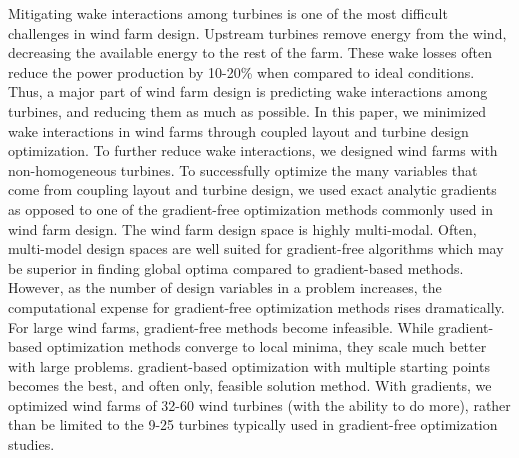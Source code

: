 
Mitigating wake interactions among turbines is one of the most difficult challenges in wind farm design. Upstream turbines remove energy from the wind, decreasing the available energy to the rest of the farm. These wake losses often reduce the power production by 10-20\% when compared to ideal conditions\cite{barthelmie2007modelling,barthelmie2009modelling,briggs2013navigating}. 
Thus, a major part of wind farm design is predicting wake interactions among turbines, and reducing them as much as possible. 
In this paper, we minimized wake interactions in wind farms through coupled layout and turbine design optimization. To further reduce wake interactions, we designed wind farms with non-homogeneous turbines.
To successfully optimize the many variables that come from coupling layout and turbine design, we used exact analytic gradients as opposed to one of the gradient-free optimization methods commonly used in wind farm design.
The wind farm design space is highly multi-modal.
Often, multi-model design spaces are well suited for gradient-free algorithms which may be superior in finding global optima compared to gradient-based methods. 
However, as the number of design variables in a problem increases, the computational expense for gradient-free optimization methods rises dramatically. %
For large wind farms, gradient-free methods become infeasible. While gradient-based optimization methods converge to local minima, they scale much better with large problems. %
gradient-based optimization with multiple starting points becomes the best, and often only, feasible solution method. With gradients, we optimized wind farms of 32-60 wind turbines (with the ability to do more), rather than be limited to the 9-25 turbines typically used in gradient-free optimization studies.%


